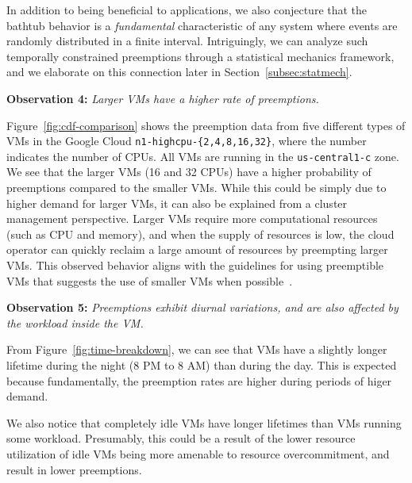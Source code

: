 
In addition to being beneficial to applications, we also conjecture that the bathtub behavior is a \emph{fundamental} characteristic of any system where events are randomly distributed in a finite interval.
Intriguingly, we can analyze such temporally constrained preemptions through a statistical mechanics framework, and we elaborate on this connection later in Section~\ref{subsec:statmech}. 


\noindent \textbf{Observation 4:}\emph{ Larger VMs have a higher rate of preemptions.}

\noindent Figure~\ref{fig:cdf-comparison} shows the preemption data from five different types of VMs in the Google Cloud \texttt{n1-highcpu-\{2,4,8,16,32\}}, where the number indicates the number of CPUs.
All VMs are running in the \texttt{us-central1-c} zone. 
We see that the larger VMs (16 and 32 CPUs) have a higher probability of preemptions compared to the smaller VMs.
While this could be simply due to higher demand for larger VMs, it can also be explained from a cluster management perspective. 
Larger VMs require more computational resources (such as CPU and memory), and when the supply of resources is low, the cloud operator can quickly reclaim a large amount of resources by preempting larger VMs.
This observed behavior aligns with the guidelines for using preemptible VMs that suggests the use of smaller VMs when possible~\cite{preemptible-documentation}. 

\noindent \textbf{Observation 5:} \emph{Preemptions exhibit diurnal variations, and are also affected by the workload inside the VM.}

\noindent From Figure~\ref{fig:time-breakdown}, we can see that VMs have a slightly longer lifetime during the night (8 PM to 8 AM) than during the day.
This is expected because fundamentally, the preemption rates are higher during periods of higer demand. 

We also notice that completely idle VMs have longer lifetimes than VMs running some workload.
Presumably, this could be a result of the lower resource utilization of idle VMs being more amenable to resource overcommitment, and result in lower preemptions. 


